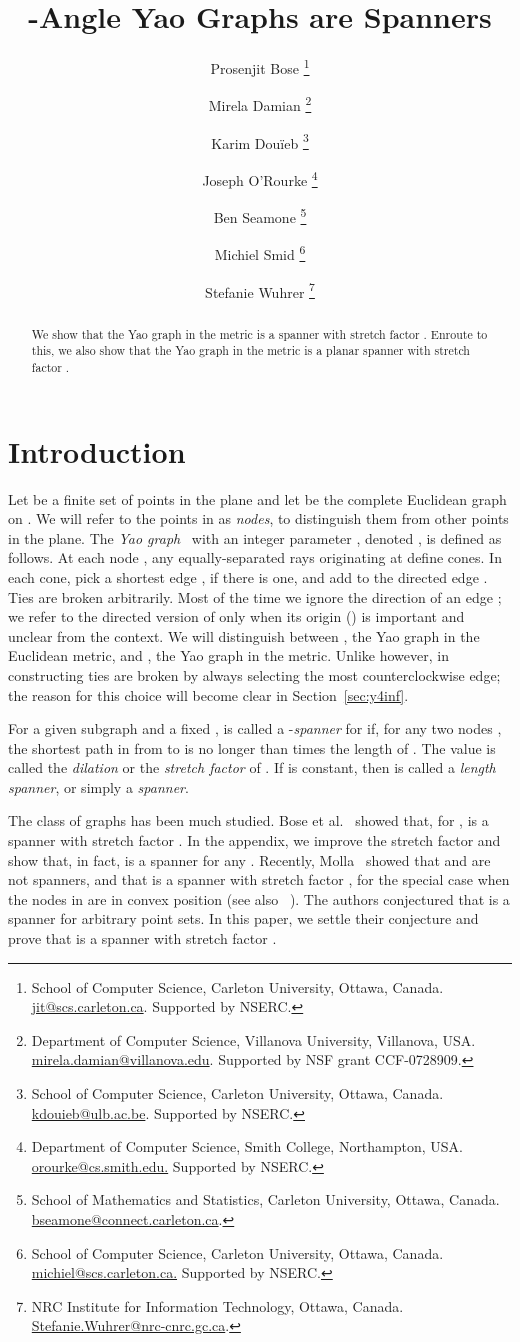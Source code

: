 \pdfoutput=1  \documentclass[11pt]{article}
\title{-Angle Yao Graphs are Spanners}
\author{
Prosenjit Bose
    \thanks{School of Computer Science, Carleton University, Ottawa, Canada. \protect\url{jit@scs.carleton.ca}.
    Supported by NSERC.}
\and
Mirela Damian
    \thanks{Department of Computer Science, Villanova University, Villanova, USA.
    \protect\url{mirela.damian@villanova.edu}. Supported by NSF grant CCF-0728909.}
\and
Karim Dou\"ieb
    \thanks{School of Computer Science, Carleton University, Ottawa, Canada. \protect\url{kdouieb@ulb.ac.be}.
    Supported by NSERC.}
\and
Joseph O'Rourke
    \thanks{Department of Computer Science, Smith College, Northampton, USA. \protect\url{orourke@cs.smith.edu.}
    Supported by NSERC.}
\and
Ben Seamone
    \thanks{School of Mathematics and Statistics, Carleton University, Ottawa, Canada. \protect\url{bseamone@connect.carleton.ca}.}
\and
Michiel Smid
    \thanks{School of Computer Science, Carleton University, Ottawa, Canada. \protect\url{michiel@scs.carleton.ca.}
    Supported by NSERC.}
\and
Stefanie Wuhrer
    \thanks{NRC Institute for Information Technology, Ottawa, Canada. \protect\url{Stefanie.Wuhrer@nrc-cnrc.gc.ca}.}
}
\date{}
\begin{document}
\maketitle

\begin{abstract}
We show that the Yao graph  in the  metric is a spanner with
stretch factor . Enroute to this, we also show that
the Yao graph  in the  metric is a planar spanner
with stretch factor .
\end{abstract}

\section{Introduction}
Let  be a finite set of points in the plane and let  be
the complete Euclidean graph on . We will refer to the points in
 as \emph{nodes}, to distinguish them from other points in the
plane.
The \emph{Yao graph}~\cite{Yao82} with an integer parameter ,
denoted , is defined as follows. At each node , any 
equally-separated rays originating at  define  cones.
In each cone, pick a shortest edge , if there is one, and add to 
the directed edge . Ties are broken arbitrarily.
Most of the time we ignore the direction of an edge ; we refer
to the directed version  of  only when its
origin () is important and unclear from the context.
We will distinguish between , the Yao graph in the Euclidean 
metric, and , the Yao graph in the  metric. Unlike
 however, in constructing  ties are broken by always
selecting the most counterclockwise edge; the reason for this choice
will become clear in Section~\ref{sec:y4inf}.

For a given subgraph  and a fixed ,  is
called a -\emph{spanner} for  if, for any two nodes
, the shortest path in  from  to  is no longer than
 times the length of .
The value  is called the \emph{dilation} or the
\emph{stretch factor} of . If  is constant, then  is called a
\emph{length spanner}, or simply a \emph{spanner}.

The class of graphs  has been much studied. Bose et al.~\cite{bmnsz-agbsp-03}
showed that, for ,  is a spanner with stretch factor
. In the appendix, we improve the stretch factor and show that, in fact, 
 is a spanner for any .
Recently, Molla~\cite{M09} showed that  and  are 
not spanners, and that  is a spanner with stretch factor 
, for the special case when the nodes in  are 
in convex position (see also ~\cite{DMP09}). 
The authors conjectured that  is a spanner for arbitrary point 
sets.
In this paper, we settle their conjecture and prove that  is a
spanner with stretch factor .
\end{document}
